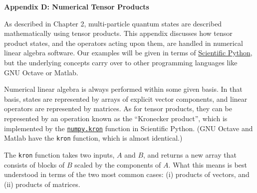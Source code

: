 \documentclass[pra,12pt]{revtex4}
\begin{document}
\begin{center}
{\large \textbf{Appendix D: Numerical Tensor Products}}
\end{center}

As described in Chapter 2, multi-particle quantum states are described
mathematically using tensor products.  This appendix discusses how
tensor product states, and the operators acting upon them, are handled
in numerical linear algebra software.  Our examples will be given in
terms of \href{https://scipy.org/}{Scientific Python}, but the
underlying concepts carry over to other programming languages like GNU
Octave or Matlab.

Numerical linear algebra is always performed within some given basis.
In that basis, states are represented by arrays of explicit vector
components, and linear operators are represented by matrices.  As for
tensor products, they can be represented by an operation known as the
``Kronecker product'', which is implemented by the
\href{https://docs.scipy.org/doc/numpy-1.13.0/reference/generated/numpy.kron.html}{\texttt{numpy.kron}}
function in Scientific Python.  (GNU Octave and Matlab have the
\texttt{kron} function, which is almost identical.)

The \texttt{kron} function takes two inputs, $A$ and $B$, and returns
a new array that consists of blocks of $B$ scaled by the components of
$A$.  What this means is best understood in terms of the two most
common cases: (i) products of vectors, and (ii) products of matrices.
\end{document}
